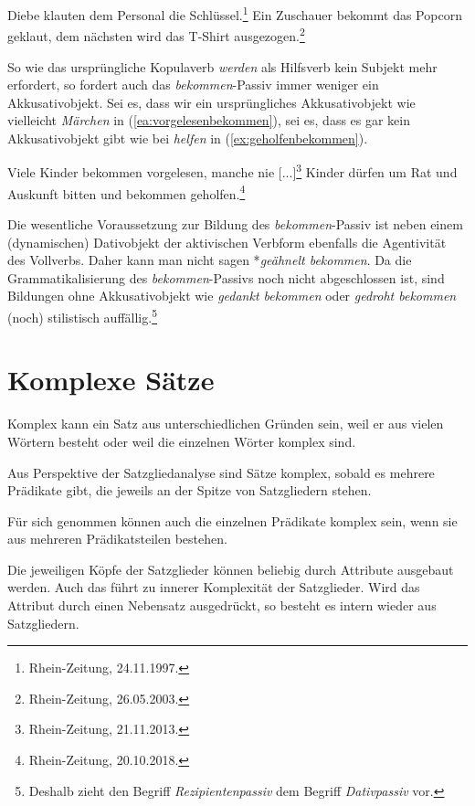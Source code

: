 \ea \label{ea:AntiRezDativ}
\ea \label{ea:klauenDat} Diebe klauten dem Personal die Schlüssel.\footnote{Rhein-Zeitung, 24.11.1997.}
\ex \label{ex:geklautbekommen} Ein Zuschauer bekommt das Popcorn geklaut, dem nächsten wird das T-Shirt ausgezogen.\footnote{Rhein-Zeitung, 26.05.2003.}
\z 
\z 

So wie das ursprüngliche Kopulaverb \textit{werden} als Hilfsverb kein Subjekt mehr erfordert, so fordert auch das \textit{bekommen}-Passiv immer weniger ein Akkusativobjekt. Sei es, dass wir ein ursprüngliches Akkusativobjekt  wie vielleicht \textit{Märchen} in (\ref{ea:vorgelesenbekommen}), sei es, dass es gar kein Akkusativobjekt gibt wie bei \textit{helfen} in (\ref{ex:geholfenbekommen}). 

\ea \label{ea:bekommenPassivohneAKK}
\ea \label{ea:vorgelesenbekommen} Viele Kinder bekommen vorgelesen, manche nie [...]\footnote{Rhein-Zeitung, 21.11.2013.} 
\ex \label{ex:geholfenbekommen} Kinder dürfen um Rat und Auskunft bitten und bekommen geholfen.\footnote{Rhein-Zeitung, 20.10.2018.}
\z 
\z 

Die wesentliche Voraussetzung zur Bildung des \textit{bekommen}-Passiv ist neben einem (dynamischen) Dativobjekt der aktivischen Verbform ebenfalls die Agentivität des Vollverbs. Daher kann man nicht sagen *\textit{geähnelt bekommen}. Da die Grammatikalisierung des \textit{bekommen}-Passivs noch nicht abgeschlossen ist, sind Bildungen ohne Akkusativobjekt wie \textit{gedankt bekommen} oder \textit{gedroht bekommen} (noch) stilistisch auffällig.\footnote{Deshalb zieht \citet[220]{Askedal2005} den Begriff \textit{Rezipientenpassiv} dem Begriff \textit{Dativpassiv} vor.} 


\section{Komplexe Sätze}\label{section:komplexeSätze}

Komplex kann ein Satz aus unterschiedlichen Gründen sein, \zB weil er aus vielen Wörtern besteht oder weil die einzelnen Wörter komplex sind. 

Aus Perspektive der Satzgliedanalyse sind Sätze komplex, sobald es mehrere Prädikate gibt, die jeweils an der Spitze von Satzgliedern stehen. 

Für sich genommen können auch die einzelnen Prädikate komplex sein, wenn sie aus mehreren Prädikatsteilen bestehen. 

Die jeweiligen Köpfe der Satzglieder können beliebig durch Attribute ausgebaut werden. Auch das führt zu innerer Komplexität der Satzglieder. Wird das Attribut durch einen Nebensatz ausgedrückt, so besteht es intern wieder aus Satzgliedern.

